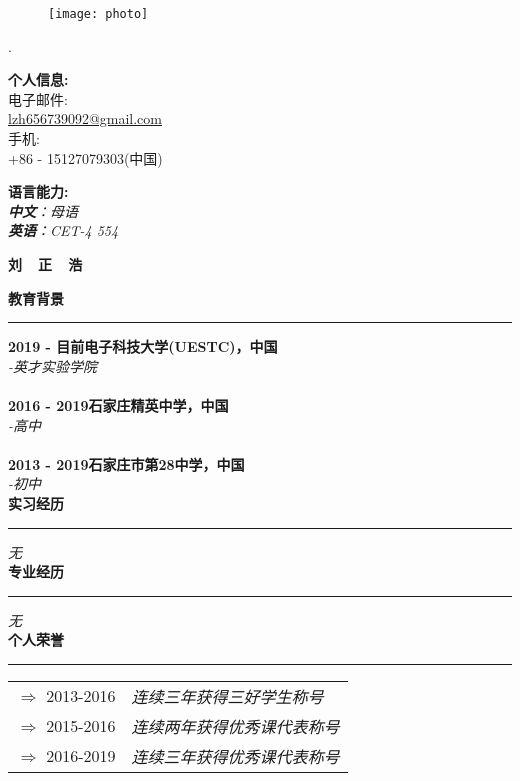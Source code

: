 \documentclass[a4paper,12pt,final]{memoir}
\newcommand{\myThemeColor}{RoyalBlue}
\newcommand{\SmallSep}{\vspace{0.9em}}
\newcommand{\CVSection}[1]
	{\Large\textbf{#1}\par
	\vspace{0.2cm}\normalsize\normalfont}
\newcommand{\CVItem}[1]
	{\textbf{\color{\myThemeColor} #1}}
\begin{document}
\begin{CJK*}{UTF8}{gbsn}%
\begin{figure}
	\hfill
	\texttt{[image: photo]}
	\vspace{-7cm}
\end{figure}
\begin{flushright}\footnotesize
.\\
\vskip 6cm
    \raggedright
	\CVItem{{\large 个人信息:}}\\
	电子邮件:\\
	\href{mailto:lzh656739092@gmail.com}{lzh656739092@gmail.com}  \\
	手机:\\
	+86 - 15127079303(中国)
		
	\CVItem{{\large 语言能力:}}\\
	\textit{\textbf{中文}：母语 \\\textbf{英语}：CET-4 554\\ }

	

	\SmallSep
\end{flushright}\normalsize
\framebreak


\Huge\bfseries {\color{\myThemeColor} 刘~~正~~浩}\\
\normalsize\normalfont

\CVSection{教育背景}
\hrule
\SmallSep
\CVItem{2019 - 目前\hfill\textsc{电子科技大学(UESTC)，中国}}\\
\textit{-英才实验学院}\\
\\
\CVItem{2016 - 2019\hfill\textsc{石家庄精英中学，中国}}\\
\textit{-高中}\\
\\
\CVItem{2013 - 2019\hfill\textsc{石家庄市第28中学，中国}}\\
\textit{-初中}\\

\CVSection{实习经历}
\hrule
\SmallSep
\textit{无}
\\

\CVSection{专业经历}
\hrule
\SmallSep
\textit{无} 
\\

\CVSection{个人荣誉}
\hrule
\SmallSep
	\begin{tabular}{l|l}
		$\Rightarrow$ 2013-2016&\textit{连续三年获得三好学生称号}\footnotesize\\
		$\Rightarrow$ 2015-2016&\textit{连续两年获得优秀课代表称号}\\
		$\Rightarrow$ 2016-2019&\textit{连续三年获得优秀课代表称号}\\
	\end{tabular}

\end{CJK*}
\end{document}
